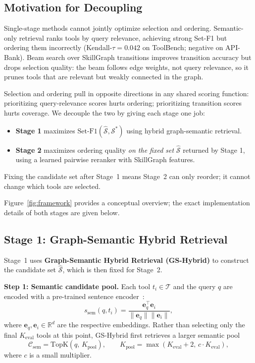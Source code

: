 \documentclass[lettersize,journal]{IEEEtran}
\begin{document}
\subsection{Motivation for Decoupling}

Single-stage methods cannot jointly optimize selection and ordering.
Semantic-only retrieval ranks tools by query relevance, achieving strong Set-F1 but ordering them incorrectly (Kendall-$\tau = 0.042$ on ToolBench; negative on API-Bank).
Beam search over SkillGraph transitions improves transition accuracy but drops selection quality: the beam follows edge weights, not query relevance, so it prunes tools that are relevant but weakly connected in the graph.

Selection and ordering pull in opposite directions in any shared scoring function: prioritizing query-relevance scores hurts ordering; prioritizing transition scores hurts coverage.
We decouple the two by giving each stage one job:
\begin{itemize}
    \item \textbf{Stage 1} maximizes $\text{Set-F1}(\hat{\mathcal{S}}, \mathcal{S}^*)$ using hybrid graph-semantic retrieval.
    \item \textbf{Stage 2} maximizes ordering quality \emph{on the fixed set} $\hat{\mathcal{S}}$ returned by Stage 1, using a learned pairwise reranker with SkillGraph features.
\end{itemize}
Fixing the candidate set after Stage~1 means Stage~2 can only reorder; it cannot change which tools are selected.



Figure~\ref{fig:framework} provides a conceptual overview; the exact implementation details of both stages are given below.

\subsection{Stage 1: Graph-Semantic Hybrid Retrieval}

Stage~1 uses \textbf{Graph-Semantic Hybrid Retrieval (GS-Hybrid)} to construct the candidate set $\hat{\mathcal{S}}$, which is then fixed for Stage~2.

\textbf{Step 1: Semantic candidate pool.}
Each tool $t_i \in \mathcal{T}$ and the query $q$ are encoded with a pre-trained sentence encoder~\cite{sentencetransformers}:
\begin{equation}
    s_{\text{sem}}(q, t_i) = \frac{\mathbf{e}_q^\top \mathbf{e}_i}{\|\mathbf{e}_q\| \|\mathbf{e}_i\|},
    \label{eq:sem_score}
\end{equation}
where $\mathbf{e}_q, \mathbf{e}_i \in \mathbb{R}^d$ are the respective embeddings.
Rather than selecting only the final $K_{\mathrm{eval}}$ tools at this point, GS-Hybrid first retrieves a larger semantic pool
\[
\mathcal{C}_{\text{sem}} = \text{TopK}\!\left(q,\, K_{\text{pool}}\right), \qquad
K_{\text{pool}} = \max(K_{\mathrm{eval}} + 2,\, c \cdot K_{\mathrm{eval}}),
\]
where $c$ is a small multiplier.
\end{document}
